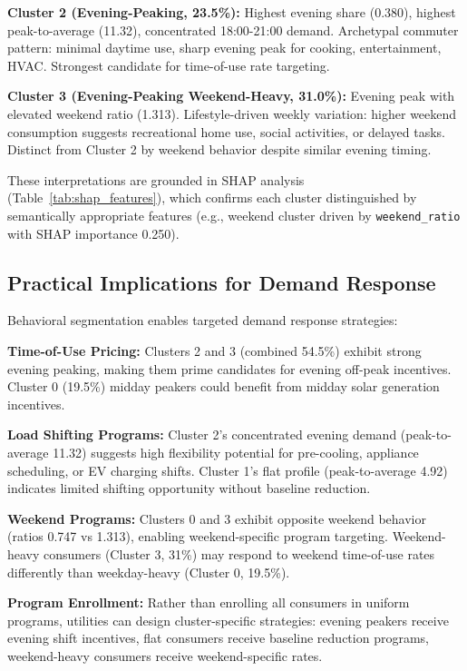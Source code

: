 \textbf{Cluster 2 (Evening-Peaking, 23.5\%):} Highest evening share (0.380), highest peak-to-average (11.32), concentrated 18:00-21:00 demand. Archetypal commuter pattern: minimal daytime use, sharp evening peak for cooking, entertainment, HVAC. Strongest candidate for time-of-use rate targeting.

\textbf{Cluster 3 (Evening-Peaking Weekend-Heavy, 31.0\%):} Evening peak with elevated weekend ratio (1.313). Lifestyle-driven weekly variation: higher weekend consumption suggests recreational home use, social activities, or delayed tasks. Distinct from Cluster 2 by weekend behavior despite similar evening timing.

These interpretations are grounded in SHAP analysis (Table~\ref{tab:shap_features}), which confirms each cluster distinguished by semantically appropriate features (e.g., weekend cluster driven by \texttt{weekend\_ratio} with SHAP importance 0.250).

\subsection{Practical Implications for Demand Response}

Behavioral segmentation enables targeted demand response strategies:

\textbf{Time-of-Use Pricing:} Clusters 2 and 3 (combined 54.5\%) exhibit strong evening peaking, making them prime candidates for evening off-peak incentives. Cluster 0 (19.5\%) midday peakers could benefit from midday solar generation incentives.

\textbf{Load Shifting Programs:} Cluster 2's concentrated evening demand (peak-to-average 11.32) suggests high flexibility potential for pre-cooling, appliance scheduling, or EV charging shifts. Cluster 1's flat profile (peak-to-average 4.92) indicates limited shifting opportunity without baseline reduction.

\textbf{Weekend Programs:} Clusters 0 and 3 exhibit opposite weekend behavior (ratios 0.747 vs 1.313), enabling weekend-specific program targeting. Weekend-heavy consumers (Cluster 3, 31\%) may respond to weekend time-of-use rates differently than weekday-heavy (Cluster 0, 19.5\%).

\textbf{Program Enrollment:} Rather than enrolling all consumers in uniform programs, utilities can design cluster-specific strategies: evening peakers receive evening shift incentives, flat consumers receive baseline reduction programs, weekend-heavy consumers receive weekend-specific rates.

